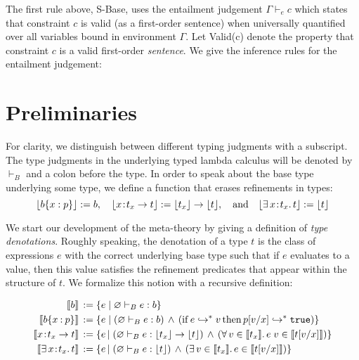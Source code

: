 \documentclass[11pt]{article}
\newcommand{\bind}{\hspace{0.1em}{:}\hspace{0.1em}} %
\newcommand{\col}{\mathbin{:}}       %
\newcommand{\lb}{\llbracket}         %
\newcommand{\rb}{\rrbracket}         %
\newcommand{\many}{\hookrightarrow^*}
\begin{document}
The first rule above, {\sc S-Base}, uses the entailment judgement $\Gamma \vdash_e c$ which states that constraint $c$ is valid (as a first-order sentence) when universally quantified over all variables bound in environment $\Gamma$.
Let {\sc Valid}(c) denote the property that constraint $c$ is a valid first-order {\em sentence}. We give the inference rules for the entailment judgement:



\section{Preliminaries}

For clarity, we distinguish between different typing judgments with a subscript.  The type judgments in the underlying typed lambda calculus will be denoted by $\vdash_B$ and a colon before the type. In order to speak about the base type underlying some type, we define a function that erases refinements in types:
\[
\lfloor b\{x:p\} \rfloor := b, \quad
\lfloor x\bind t_x \rightarrow t\rfloor := \lfloor t_x \rfloor \rightarrow \lfloor t \rfloor
, \quad{\rm and}\quad
\lfloor \exists\, x\bind t_x.\, t\rfloor := \lfloor t\rfloor
\]

We start our development of the meta-theory by giving a definition of {\em type denotations}. Roughly speaking, the denotation of a type $t$ is the class of expressions $e$ with the correct underlying base type such that if $e$ evaluates to a value, then this value satisfies the refinement predicates that appear within the structure of $t$. We formalize this notion with a recursive definition:

\begin{align*}
\lb b \rb \,&:= \{ e \;|\; \varnothing \vdash_B e : b\}\\
\lb b\{x\col p\}\rb \,&:= 
  \{ e \;|\; (\varnothing \vdash_B e:b)
\,\wedge\, ({\rm if}\, e \many v \,{\rm then}\, p[v/x] \many {\tt true})\} \\
\lb x\bind t_x \rightarrow t\rb \,&:= 
\{ e \,|\; (\varnothing \vdash_B e : \lfloor t_x\rfloor \rightarrow \lfloor t\rfloor ) \,\wedge\,
( \forall\, v \in \lb t_x \rb.\, e\; v \in \lb t[v/x] \rb)\} \\
\lb \exists\, x\bind t_x .\, t\rb \,&:= 
\{ e \,|\; (\varnothing \vdash_B e : \lfloor t\rfloor ) \,\wedge\,
( \exists\, v \in \lb t_x \rb.\, e \in \lb t[v/x] \rb)\}
\end{align*}
\end{document}
